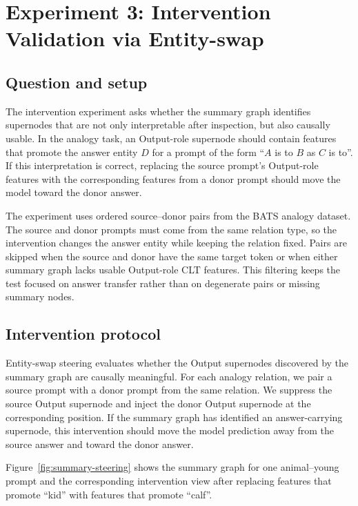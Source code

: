 \documentclass[../main.tex]{subfiles}
\begin{document}
\section{Experiment 3: Intervention Validation via Entity-swap}
\label{sec:steering-experiment}

\subsection{Question and setup}

The intervention experiment asks whether the summary graph identifies
supernodes that are not only interpretable after inspection, but also causally
usable. In the analogy task, an Output-role supernode should contain features
that promote the answer entity $D$ for a prompt of the form ``$A$ is to $B$ as
$C$ is to''. If this interpretation is correct, replacing the source prompt's
Output-role features with the corresponding features from a donor prompt should
move the model toward the donor answer.

The experiment uses ordered source--donor pairs from the BATS analogy dataset.
The source and donor prompts must come from the same relation type, so the
intervention changes the answer entity while keeping the relation fixed. Pairs
are skipped when the source and donor have the same target token or when either
summary graph lacks usable Output-role CLT features. This filtering keeps the
test focused on answer transfer rather than on degenerate pairs or missing
summary nodes.

\subsection{Intervention protocol}

Entity-swap steering evaluates whether the Output supernodes discovered by the
summary graph are causally meaningful. For each analogy relation, we pair a source
prompt with a donor prompt from the same relation. We suppress the source
Output supernode and inject the donor Output supernode at the corresponding
position. If the summary graph has identified an answer-carrying supernode, this
intervention should move the model prediction away from the source answer and
toward the donor answer.

Figure~\ref{fig:summary-steering} shows the summary graph for one animal--young prompt
and the corresponding intervention view after replacing features that promote
``kid'' with features that promote ``calf''.
\end{document}
